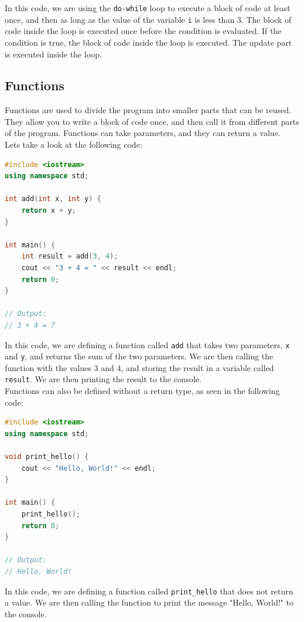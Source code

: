 In this code, we are using the \texttt{do-while} loop to execute a block of code at least once, and then as long as the value
of the variable \texttt{i} is less than 3. The block of code inside the loop is executed once before the condition is evaluated.
If the condition is true, the block of code inside the loop is executed. The update part is executed inside the loop.\\

\subsection{Functions}

Functions are used to divide the program into smaller parts that can be reused. They allow you to write a block of code once,
and then call it from different parts of the program. Functions can take parameters, and they can return a value.\\

Lets take a look at the following code:

\begin{lstlisting}[language=C++]
#include <iostream>
using namespace std;

int add(int x, int y) {
    return x + y;
}

int main() {
    int result = add(3, 4);
    cout << "3 + 4 = " << result << endl;
    return 0;
}

// Output:
// 3 + 4 = 7
\end{lstlisting}

In this code, we are defining a function called \texttt{add} that takes two parameters, \texttt{x} and \texttt{y}, and returns
the sum of the two parameters. We are then calling the function with the values 3 and 4, and storing the result in a variable
called \texttt{result}. We are then printing the result to the console.\\

Functions can also be defined without a return type, as seen in the following code:

\begin{lstlisting}[language=C++]
#include <iostream>
using namespace std;

void print_hello() {
    cout << "Hello, World!" << endl;
}

int main() {
    print_hello();
    return 0;
}

// Output:
// Hello, World!
\end{lstlisting}

In this code, we are defining a function called \texttt{print\_hello} that does not return a value. We are then calling the
function to print the message "Hello, World!" to the console.\\

